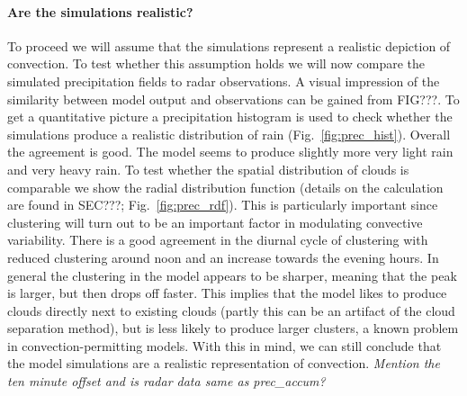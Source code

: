 \documentclass[a4paper, 12pt]{article}
\begin{document}
\paragraph{Are the simulations realistic?} To proceed we will assume that the simulations represent a realistic depiction of convection. To test whether this assumption holds we will now compare the simulated precipitation fields to radar observations. A visual impression of the similarity between model output and observations can be gained from FIG???. To get a quantitative picture a precipitation histogram is used to check whether the simulations produce a realistic distribution of rain (Fig.~\ref{fig:prec_hist}). Overall the agreement is good. The model seems to produce slightly more very light rain and very heavy rain. To test whether the spatial distribution of clouds is comparable we show the radial distribution function (details on the calculation are found in SEC???; Fig.~\ref{fig:prec_rdf}). This is particularly important since clustering will turn out to be an important factor in modulating convective variability. There is a good agreement in the diurnal cycle of clustering with reduced clustering around noon and an increase towards the evening hours. In general the clustering in the model appears to be sharper, meaning that the peak is larger, but then drops off faster. This implies that the model likes to produce clouds directly next to existing clouds (partly this can be an artifact of the cloud separation method), but is less likely to produce larger clusters, a known problem in convection-permitting models. With this in mind, we can still conclude that the model simulations are a realistic representation of convection.  \textit{Mention the ten minute offset and is radar data same as prec_accum?}
\end{document}
